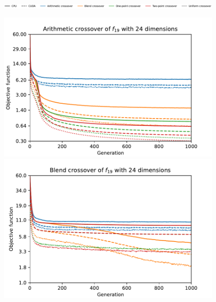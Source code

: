 \begin{figure}[ht!]
    \begin{minipage}{\textwidth}
        \centering
        \includegraphics[width=\textwidth]{img/runs/time_es_crossover_legend.pdf}
    \end{minipage}

    \caption[Running times of crossover operators]{}
\end{figure}


\begin{figure}[ht!]
    \begin{minipage}[t]{0.32\textwidth}
        \centering
        \includegraphics[width=\textwidth]{img/runs/fitness_es_crossover_f19_dim24_Arithmetic.pdf}
    \end{minipage}
    \hfill
    \begin{minipage}[t]{0.32\textwidth}
        \centering
        \includegraphics[width=\textwidth]{img/runs/fitness_es_crossover_f19_dim24_Blend.pdf}

\end{minipage}
\end{figure}
